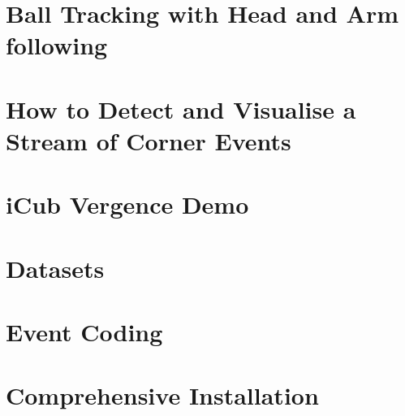 \documentclass[twoside]{book}
\newcommand{\+}{\discretionary{\mbox{\scriptsize$\hookleftarrow$}}{}{}}
\begin{document}
\chapter{Ball Tracking with Head and Arm following}
\label{md__mnt_c_Users_AGlover_Documents_projects_event-driven_documentation_4balldemo}

\chapter{How to Detect and Visualise a Stream of Corner Events}
\label{md__mnt_c_Users_AGlover_Documents_projects_event-driven_documentation_5corners}

\chapter{i\+Cub Vergence Demo}
\label{md__mnt_c_Users_AGlover_Documents_projects_event-driven_documentation_6vergence}

\chapter{Datasets}
\label{md__mnt_c_Users_AGlover_Documents_projects_event-driven_documentation_datasets}

\chapter{Event Coding}
\label{md__mnt_c_Users_AGlover_Documents_projects_event-driven_documentation_eventcodecs}

\chapter{Comprehensive Installation}
\label{md__mnt_c_Users_AGlover_Documents_projects_event-driven_documentation_full_installation}

\end{document}
